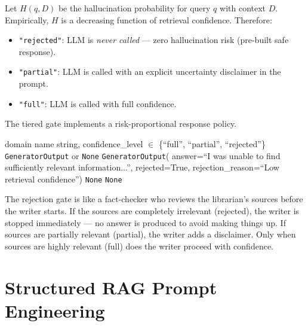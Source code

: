 \documentclass[12pt,a4paper]{article}
\theoremstyle{definition}
\theoremstyle{plain}
\theoremstyle{remark}
\newcommand{\layman}[1]{\begin{tcolorbox}[laymanstyle]#1\end{tcolorbox}}
\begin{document}
\begin{tcolorbox}[thmstyle, title={Theorem 3.1 — Tiered Rejection Reduces Hallucination}]
Let $H(q, D)$ be the hallucination probability for query $q$ with context $D$. Empirically, $H$ is a decreasing function of retrieval confidence. Therefore:
\begin{itemize}[noitemsep]
  \item \texttt{"rejected"}: LLM is \emph{never called} — zero hallucination risk (pre-built safe response).
  \item \texttt{"partial"}: LLM is called with an explicit uncertainty disclaimer in the prompt.
  \item \texttt{"full"}: LLM is called with full confidence.
\end{itemize}
The tiered gate implements a risk-proportional response policy.
\end{tcolorbox}

\begin{algorithm}[H]
\caption{make\_tiered\_response(domain\_name, confidence\_level)}
\begin{algorithmic}[1]
\Require domain name string, confidence\_level $\in$ \{``full'', ``partial'', ``rejected''\}
\Ensure \texttt{GeneratorOutput} or \texttt{None}
  \State \Return \texttt{GeneratorOutput}(
  \Statex \quad answer=``I was unable to find sufficiently relevant information...'',
  \Statex \quad rejected=True, rejection\_reason=``Low retrieval confidence'')
  \State \Return \texttt{None} 
\Else {}
  \State \Return \texttt{None} 
\EndIf
\end{algorithmic}
\end{algorithm}

\layman{The rejection gate is like a fact-checker who reviews the librarian's sources before the writer starts. If the sources are completely irrelevant (rejected), the writer is stopped immediately — no answer is produced to avoid making things up. If sources are partially relevant (partial), the writer adds a disclaimer. Only when sources are highly relevant (full) does the writer proceed with confidence.}

\section{Structured RAG Prompt Engineering}
\end{document}

